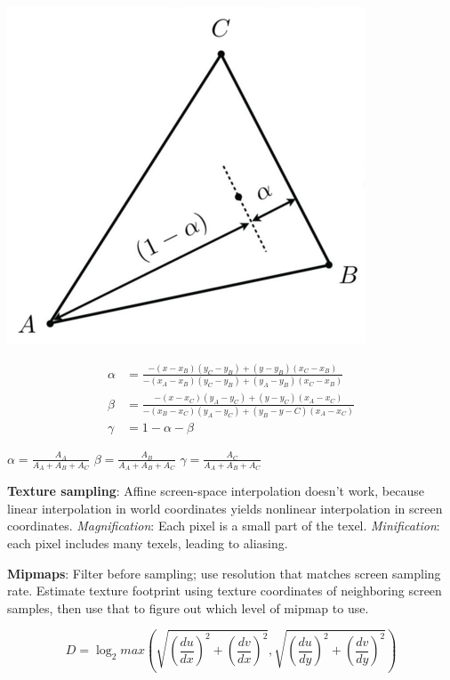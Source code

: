 \documentclass[9pt,landscape]{extarticle}
\begin{document}
\begin{multicols}{3}
\begin{multicols}{2}
\includegraphics[scale=0.18]{barycentric_ratio}

\end{multicols}

\begin{align*}
\alpha &= \frac{-(x - x_B)(y_C - y_B) + (y - y_B)(x_C - x_B)}{-(x_A - x_B)(y_C - y_B) + (y_A - y_B)(x_C - x_B)} \\
\beta &= \frac{-(x - x_C)(y_A - y_C) + (y - y_C)(x_A - x_C)}{-(x_B - x_C)(y_A - y_C) + (y_B - y-C)(x_A - x_C)} \\
\gamma &= 1 - \alpha - \beta
\end{align*}

\begin{multicols}{3}
$\alpha = \frac{A_A}{A_A + A_B + A_C}$
\columnbreak
$\beta = \frac{A_B}{A_A + A_B + A_C}$
\columnbreak
$\gamma = \frac{A_C}{A_A + A_B + A_C}$
\end{multicols}

\textbf{Texture sampling}: Affine screen-space interpolation doesn't work, because linear interpolation in world coordinates yields nonlinear interpolation in screen coordinates. \textit{Magnification}: Each pixel is a small part of the texel. \textit{Minification}: each pixel includes many texels, leading to aliasing.

\textbf{Mipmaps}: Filter before sampling; use resolution that matches screen sampling rate. Estimate texture footprint using texture coordinates of neighboring screen samples, then use that to figure out which level of mipmap to use.

$$
D = \log_2 max\left(\sqrt{\left(\frac{du}{dx}\right)^2 + \left(\frac{dv}{dx}\right)^2}, \sqrt{\left(\frac{du}{dy}\right)^2 + \left(\frac{dv}{dy}\right)^2}\right)
$$


\end{multicols}
\end{document}
